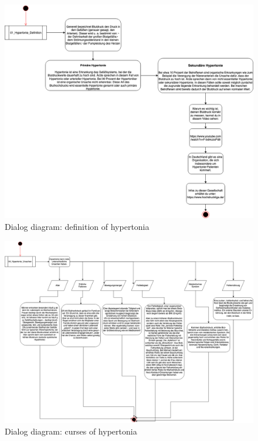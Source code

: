\begin{figure}[h!]
	\centering
	\includegraphics[width=1\textwidth]{images/01_Hypertonie_Definition.png}
	\caption{Dialog diagram: definition of hypertonia}
	\label{dialog_diagram_01}
\end{figure}

\begin{figure}[h!]
	\centering
	\includegraphics[width=1\textwidth]{images/02_Hypertonie_Ursachen.png}
	\caption{Dialog diagram: curses of hypertonia}
	\label{dialog_diagram_02}
\end{figure}

